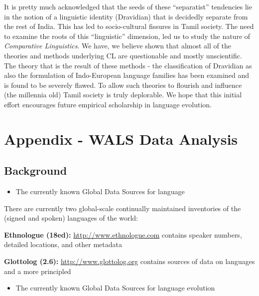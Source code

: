 \newpage

It is pretty much acknowledged that the seeds of these “separatist” tendencies lie in the notion of a linguistic identity (Dravidian) that is decidedly separate from the rest of India. This has led to socio-cultural fissures in Tamil society. The need to examine the roots of this “linguistic” dimension, led us to study the nature of \textit{Comparative Linguistics}. We have, we believe shown that almost all of the theories and methods underlying CL are questionable and mostly unscientific. The theory that is the result of these methods - the classification of Dravidian as also the formulation of Indo-European language families has been examined and is found to be severely flawed. To allow such theories to flourish and influence (the millennia old) Tamil society is truly deplorable. We hope that this initial effort encourages future empirical scholarship in language evolution.


\section*{Appendix - WALS Data Analysis}

\subsection*{Background\protect{}}

\begin{itemize}
\item The currently known Global Data Sources for language

\end{itemize}

There are currently two global-scale continually maintained inventories of the (signed and spoken) languages of the world:

\textbf{Ethnologue (18ed):} \url{http://www.ethnologue.com} contains speaker numbers, detailed locations, and other metadata

\textbf{Glottolog (2.6):} \url{http://www.glottolog.org} contains sources of data on languages and a more principled

\begin{itemize}
\item The currently known Global Data Sources for language evolution

\end{itemize}

